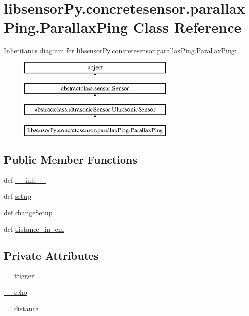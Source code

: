 \hypertarget{classlibsensorPy_1_1concretesensor_1_1parallaxPing_1_1ParallaxPing}{}\section{libsensor\+Py.\+concretesensor.\+parallax\+Ping.\+Parallax\+Ping Class Reference}
\label{classlibsensorPy_1_1concretesensor_1_1parallaxPing_1_1ParallaxPing}
Inheritance diagram for libsensor\+Py.\+concretesensor.\+parallax\+Ping.\+Parallax\+Ping\+:\begin{figure}[H]
\begin{center}
\leavevmode
\includegraphics[height=4.000000cm]{classlibsensorPy_1_1concretesensor_1_1parallaxPing_1_1ParallaxPing}
\end{center}
\end{figure}
\subsection*{Public Member Functions}
\begin{DoxyCompactItemize}
\item 
def \hyperlink{classlibsensorPy_1_1concretesensor_1_1parallaxPing_1_1ParallaxPing_a7407b3cb9db0901da763ebfbd00fbd4f}{\+\_\+\+\_\+init\+\_\+\+\_\+}
\item 
def \hyperlink{classlibsensorPy_1_1concretesensor_1_1parallaxPing_1_1ParallaxPing_a6194364eeaa296a43494e2f093be5eef}{setup}
\item 
def \hyperlink{classlibsensorPy_1_1concretesensor_1_1parallaxPing_1_1ParallaxPing_a20e3746000d4324d86e2fead392b3316}{change\+Setup}
\item 
def \hyperlink{classlibsensorPy_1_1concretesensor_1_1parallaxPing_1_1ParallaxPing_ab9d5c398e88f52fac0eb4aba1af2150a}{distance\+\_\+in\+\_\+cm}
\end{DoxyCompactItemize}
\subsection*{Private Attributes}
\begin{DoxyCompactItemize}
\item 
\hyperlink{classlibsensorPy_1_1concretesensor_1_1parallaxPing_1_1ParallaxPing_a3e5d729761f044a7b0fde75695b03c90}{\+\_\+\+\_\+trigger}
\item 
\hyperlink{classlibsensorPy_1_1concretesensor_1_1parallaxPing_1_1ParallaxPing_a06912e7a9b576ea6664bfeb518b1b309}{\+\_\+\+\_\+echo}
\item 
\hyperlink{classlibsensorPy_1_1concretesensor_1_1parallaxPing_1_1ParallaxPing_a811bdf2595d89815fc7410d8587ef0cb}{\+\_\+\+\_\+distance}
\end{DoxyCompactItemize}


